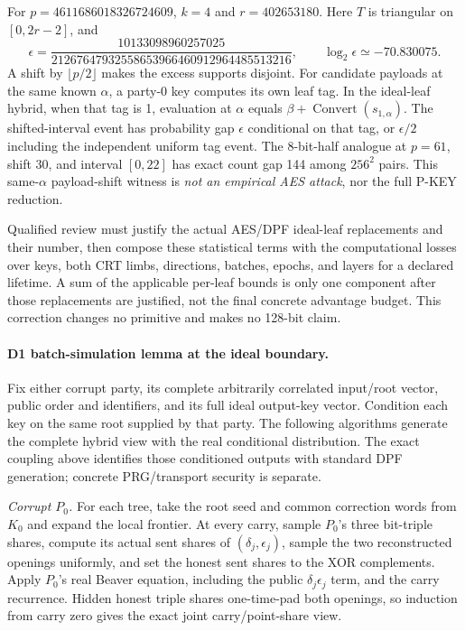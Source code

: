 \documentclass[11pt]{article}
\begin{document}
For $p=4611686018326724609$, $k=4$ and $r=402653180$.
Here $T$ is triangular on $[0,2r-2]$, and
\[
 \epsilon=
 \frac{10133098960257025}{21267647932558653966460912964485513216},
 \qquad \log_2\epsilon\simeq-70.830075.
\]
A shift by $\lfloor p/2\rfloor$ makes the excess supports disjoint.
For candidate payloads at the same known $\alpha$, a party-0 key computes
its own leaf tag. In the ideal-leaf hybrid, when that tag is 1, evaluation
at $\alpha$ equals $\beta+\operatorname{Convert}(s_{1,\alpha})$.
The shifted-interval event has probability gap $\epsilon$ conditional on
that tag, or $\epsilon/2$ including the independent uniform tag event.
The 8-bit-half analogue at $p=61$, shift 30, and interval $[0,22]$ has
exact count gap 144 among $256^2$ pairs.
This same-$\alpha$ payload-shift witness is \emph{not an empirical AES
attack}, nor the full P-KEY reduction.

Qualified review must justify the actual AES/DPF ideal-leaf replacements and
their number, then compose these statistical terms with the computational
losses over keys, both CRT limbs, directions, batches, epochs, and layers
for a declared lifetime. A sum of the applicable per-leaf bounds is only
one component after those replacements are justified, not the final concrete
advantage budget. This correction changes no primitive and makes no 128-bit
claim.

\paragraph{D1 batch-simulation lemma at the ideal boundary.}
Fix either corrupt party, its complete arbitrarily correlated input/root
vector, public order and identifiers, and its full ideal output-key vector.
Condition each key on the same root supplied by that party. The following
algorithms generate the complete hybrid view with the real conditional
distribution. The exact coupling above identifies those conditioned outputs
with standard DPF generation; concrete PRG/transport security is separate.

\emph{Corrupt $P_0$.}
For each tree, take the root seed and common correction words from $K_0$ and
expand the local frontier. At every carry, sample $P_0$'s three bit-triple
shares, compute its actual sent shares of $(\delta_j,\epsilon_j)$, sample the
two reconstructed openings uniformly, and set the honest sent shares to the
XOR complements. Apply $P_0$'s real Beaver equation, including the public
$\delta_j\epsilon_j$ term, and the carry recurrence. Hidden honest triple
shares one-time-pad both openings, so induction from carry zero gives the
exact joint carry/point-share view.
\end{document}
